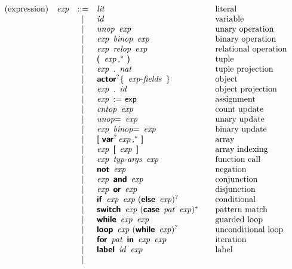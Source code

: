 $$
\begin{array}{@{}lrcl@{\qquad}l}
\text{(expression)} & \x{exp} &::=&
  \x{lit}
    & \text{literal} \\&&|&
  \x{id}
    & \text{variable} \\&&|&
  \x{unop}~\x{exp}
    & \text{unary operation} \\&&|&
  \x{exp}~\x{binop}~\x{exp}
    & \text{binary operation} \\&&|&
  \x{exp}~\x{relop}~\x{exp}
    & \text{relational operation} \\&&|&
  \K(~\x{exp}\K,^\ast~\K)
    & \text{tuple} \\&&|&
  \x{exp}~\K.~\x{nat}
    & \text{tuple projection} \\&&|&
  \KK{actor}^? \K\{~\x{exp-fields}~\K\}
    & \text{object} \\&&|&
  \x{exp}~\K.~\x{id}
    & \text{object projection} \\&&|&
  \x{exp}~\K{:=}~\K{exp}
    & \text{assignment} \\&&|&
  \x{cntop}~\x{exp}
    & \text{count update} \\&&|&
  \x{unop}{\!\K=}~\x{exp}
    & \text{unary update} \\&&|&
  \x{exp}~\x{binop}{\!\K=}~\x{exp}
    & \text{binary update} \\&&|&
  \K[~\KK{var}^? \x{exp}\K,^\ast~\K]
    & \text{array} \\&&|&
  \x{exp}~\K[~\x{exp}~\K]
    & \text{array indexing} \\&&|&
  \x{exp}~\x{typ-args}~\x{exp}
    & \text{function call} \\&&|&
  \KK{not}~\x{exp}
    & \text{negation} \\&&|&
  \x{exp}~\KK{and}~\x{exp}
    & \text{conjunction} \\&&|&
  \x{exp}~\KK{or}~\x{exp}
    & \text{disjunction} \\&&|&
  \KK{if}~\x{exp}~\x{exp}~(\KK{else}~\x{exp})^?
    & \text{conditional} \\&&|&
  \KK{switch}~\x{exp}~(\KK{case}~\x{pat}~\x{exp})^\ast
    & \text{pattern match} \\&&|&
  \KK{while}~\x{exp}~\x{exp}
    & \text{guarded loop} \\&&|&
  \KK{loop}~\x{exp}~(\KK{while}~\x{exp})^?
    & \text{unconditional loop} \\&&|&
  \KK{for}~\x{pat}~\KK{in}~\x{exp}~\x{exp}
    & \text{iteration} \\&&|&
  \KK{label}~\x{id}~\x{exp}
    & \text{label} \\&&|&

\end{array}$$
